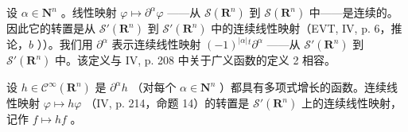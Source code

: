 设 \(\alpha \in \mathbf{N}^n\) 。线性映射 \(\varphi \mapsto \partial^\alpha \varphi\) ——从 \(\mathcal{S}(\mathbf{R}^n)\) 到 \(\mathcal{S}(\mathbf{R}^n)\) 中——是连续的。因此它的转置是从 \(\mathcal{S}'(\mathbf{R}^n)\) 到 \(\mathcal{S}'(\mathbf{R}^n)\) 中的连续线性映射（EVT, IV, p. 6，推论，\(b\) ））。我们用 \(\partial^\alpha\) 表示连续线性映射 \((-1)^{|\alpha|}{}^{t}\partial^\alpha\) ——从 \(\mathcal{S}'(\mathbf{R}^n)\) 到 \(\mathcal{S}'(\mathbf{R}^n)\) 中。该定义与 IV, p. 208 中关于广义函数的定义 2 相容。

设 \(h \in \mathcal{C}^{\infty}(\mathbf{R}^{n})\) 是 \(\partial^{\alpha}h\) （对每个 \(\alpha \in \mathbf{N}^{n}\) ）都具有多项式增长的函数。连续线性映射 \(\varphi \mapsto h\varphi\) （IV, p. 214，命题 14）的转置是 \(\mathcal{S}'(\mathbf{R}^{n})\) 上的连续线性映射，记作 \(f \mapsto hf\) 。
\relax{}

